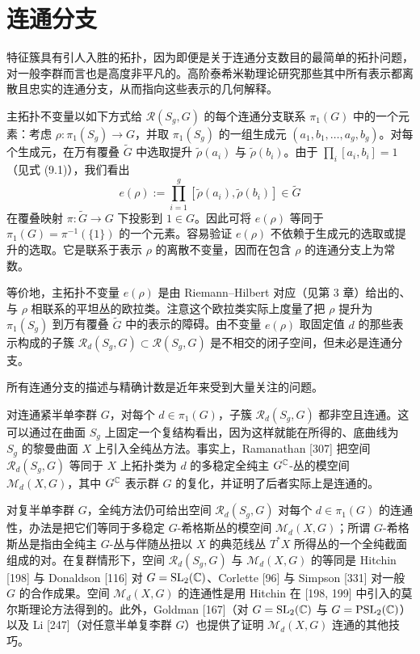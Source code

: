 \section{连通分支}

特征簇具有引人入胜的拓扑，因为即便是关于连通分支数目的最简单的拓扑问题，对一般李群而言也是高度非平凡的。高阶泰希米勒理论研究那些其中所有表示都离散且忠实的连通分支，从而指向这些表示的几何解释。

主拓扑不变量以如下方式给 $\mathcal{R}(S_g,G)$ 的每个连通分支联系 $\pi_1(G)$ 中的一个元素：考虑 $\rho:\pi_1(S_g)\to G$，并取 $\pi_1(S_g)$ 的一组生成元 $(a_1,b_1,\dots,a_g,b_g)$。对每个生成元，在万有覆叠 $\tilde G$ 中选取提升 $\tilde\rho(a_i)$ 与 $\tilde\rho(b_i)$。由于 $\prod_i[a_i,b_i]=1$（见式 (9.1)），我们看出
\[
e(\rho):=\prod_{i=1}^{g}[\tilde\rho(a_i),\tilde\rho(b_i)]\in\tilde G
\]
在覆叠映射 $\pi:\tilde G\to G$ 下投影到 $1\in G$。因此可将 $e(\rho)$ 等同于 $\pi_1(G)=\pi^{-1}(\{1\})$ 的一个元素。容易验证 $e(\rho)$ 不依赖于生成元的选取或提升的选取。它是联系于表示 $\rho$ 的离散不变量，因而在包含 $\rho$ 的连通分支上为常数。


等价地，主拓扑不变量 $e(\rho)$ 是由 Riemann–Hilbert 对应（见第 3 章）给出的、与 $\rho$ 相联系的平坦丛的欧拉类。注意这个欧拉类实际上度量了把 $\rho$ 提升为 $\pi_1(S_g)$ 到万有覆叠 $\tilde G$ 中的表示的障碍。由不变量 $e(\rho)$ 取固定值 $d$ 的那些表示构成的子簇 $\mathcal{R}_d(S_g,G)\subset\mathcal{R}(S_g,G)$ 是不相交的闭子空间，但未必是连通分支。

所有连通分支的描述与精确计数是近年来受到大量关注的问题。

对连通紧半单李群 $G$，对每个 $d\in\pi_1(G)$，子簇 $\mathcal{R}_d(S_g,G)$ 都非空且连通。这可以通过在曲面 $S_g$ 上固定一个复结构看出，因为这样就能在所得的、底曲线为 $S_g$ 的黎曼曲面 $X$ 上引入全纯丛方法。事实上，Ramanathan [307] 把空间 $\mathcal{R}_d(S_g,G)$ 等同于 $X$ 上拓扑类为 $d$ 的多稳定全纯主 $G^{\mathbb{C}}$-丛的模空间 $\mathcal{M}_d(X,G)$，其中 $G^{\mathbb{C}}$ 表示群 $G$ 的复化，并证明了后者实际上是连通的。

对复半单李群 $G$，全纯方法仍可给出空间 $\mathcal{R}_d(S_g,G)$ 对每个 $d\in\pi_1(G)$ 的连通性，办法是把它们等同于多稳定 $G$-希格斯丛的模空间 $\mathcal{M}_d(X,G)$；所谓 $G$-希格斯丛是指由全纯主 $G$-丛与伴随丛扭以 $X$ 的典范线丛 $T^*X$ 所得丛的一个全纯截面组成的对。在复群情形下，空间 $\mathcal{R}_d(S_g,G)$ 与 $\mathcal{M}_d(X,G)$ 的等同是 Hitchin [198] 与 Donaldson [116] 对 $G=\operatorname{SL}_2(\mathbb{C})$、Corlette [96] 与 Simpson [331] 对一般 $G$ 的合作成果。空间 $\mathcal{M}_d(X,G)$ 的连通性是用 Hitchin 在 [198, 199] 中引入的莫尔斯理论方法得到的。此外，Goldman [167]（对 $G=\operatorname{SL}_2(\mathbb{C})$ 与 $G=\operatorname{PSL}_2(\mathbb{C})$）以及 Li [247]（对任意半单复李群 $G$）也提供了证明 $\mathcal{M}_d(X,G)$ 连通的其他技巧。

